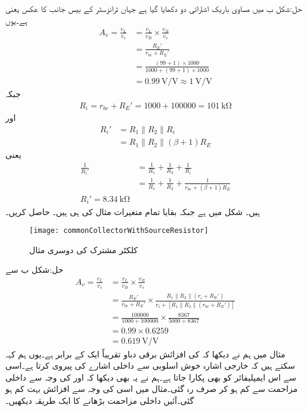 حل:شکل  ب میں مساوی باریک اشاراتی دو دکھایا گیا ہے جہاں  ٹرانزسٹر کے بیس جانب  کا عکس یعنی   ہے۔یوں
\begin{align*}
A_v=\frac{v_L}{v_s}&=\frac{v_L}{v_B} \times \frac{v_B}{v_s}\\
&=\frac{R_E'}{r_{be}+R_E'}\\
&=\frac{\left(99+1 \right) \times 1000}{1000+\left(99+1 \right)  \times 1000}\\
&=\SI[per=frac,fraction=nice]{0.99}{\volt \per \volt} \approx \SI[per=frac,fraction=nice]{1}{\volt \per \volt} 
\end{align*}
جبکہ
\begin{align*}
R_i=r_{be}+R_E'=1000+100000=\SI{101}{\kilo \ohm}
\end{align*}
اور
\begin{align*}
R_i'&=R_1 \mathbin{\|} R_2 \mathbin{\|} R_i\\
&=R_1 \mathbin{\|} R_2 \mathbin{\|} \left(\beta+1 \right) R_E
\end{align*}
یعنی
\begin{align*}
\frac{1}{R_i'}&=\frac{1}{R_1}+\frac{1}{R_2}+\frac{1}{R_i}\\
&=\frac{1}{R_1}+\frac{1}{R_2}+\frac{1}{r_{be}+\left(\beta+1 \right) R_E}\\
R_i'=\SI{8.34}{\kilo \ohm}
\end{align*}
ہیں۔
شکل  میں  ہے جبکہ بقایا تمام متغیرات مثال  کی ہی ہیں۔ حاصل کریں۔
\begin{figure}
\centering
\texttt{[image: commonCollectorWithSourceResistor]}
\caption{کلکٹر  مشترک کی دوسری مثال}
\label{شکل_ٹرانزسٹر_کلکٹر _مشترک_دوسری_مثال}
\end{figure}

حل:شکل  ب سے
\begin{align*}
A_v=\frac{v_L}{v_s}&=\frac{v_L}{v_B} \times \frac{v_B}{v_s}\\
&=\frac{R_E'}{r_{be}+R_E'} \times \frac{R_1 \mathbin{\|} R_2 \mathbin{\|} \left(r_i+R_E' \right)}{r_i+[R_1 \mathbin{\|} R_2 \mathbin{\|} \left(r_{be}+R_E' \right)]}\\
&=\frac{100000}{1000+100000} \times \frac{8367}{5000+8367}\\
&=0.99 \times 0.6259\\
&=\SI[per =frac,fraction=nice]{0.619}{\volt \per \volt}
\end{align*}
مثال  میں ہم نے دیکھا کہ  کی افزائش برقی دباو تقریباً ایک کے برابر ہے۔یوں ہم کہہ سکتے ہیں کہ خارجی اشارہ خوش اسلوبی سے داخلی اشارے کی پیروی کرتا ہے۔اسی سے اس ایمپلیفائر کو  بھی پکارا جاتا ہے۔ہم نے یہ بھی دیکھا کہ  اور  کی وجہ سے داخلی مزاحمت  سے کم ہو کر صرف  رہ  گئی۔مثال  میں اسی کی وجہ سے افزائش بہت کم ہو گئی۔آئیں داخلی مزاحمت بڑھانے کا ایک طریقہ دیکھیں۔

